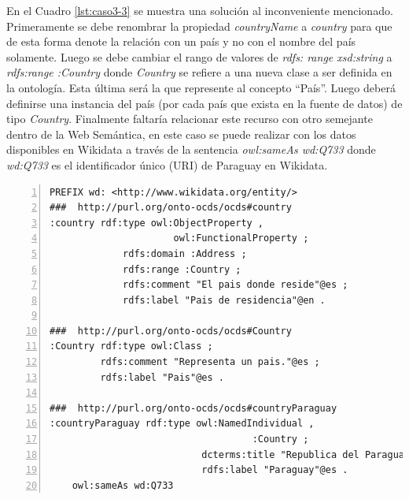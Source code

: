  En el Cuadro \ref{lst:caso3-3} se muestra una solución al inconveniente mencionado. Primeramente se debe renombrar la propiedad \textit{countryName} a \textit{country} para que de esta forma denote la relación con un país y no con el nombre del país solamente. Luego se debe cambiar el rango de valores de \textit{rdfs: range xsd:string}  a \textit{rdfs:range :Country }donde \textit{Country} se refiere a una nueva clase a ser definida en la ontología. Esta última será la que represente al concepto “País”. Luego deberá definirse una instancia del país (por cada país que exista en la fuente de datos) de tipo \textit{Country}. Finalmente faltaría relacionar este recurso con otro semejante dentro de la Web Semántica, en este caso se puede realizar con los datos disponibles en Wikidata a través de la sentencia \textit{owl:sameAs wd:Q733} donde \textit{wd:Q733} es el identificador único (URI) de Paraguay en Wikidata.\hfill \break

\noindent\begin{minipage}[c]{\textwidth}
 \begin{lstlisting}[captionpos=b, caption=Declaración de la Clase Country, label={lst:caso3-3},  numbers=left,  numberstyle=\tiny\color{mygray},frame=single]
PREFIX wd: <http://www.wikidata.org/entity/>
###  http://purl.org/onto-ocds/ocds#country
:country rdf:type owl:ObjectProperty ,
                      owl:FunctionalProperty ;
             rdfs:domain :Address ;
             rdfs:range :Country ;
             rdfs:comment "El pais donde reside"@es ;
             rdfs:label "Pais de residencia"@en .

###  http://purl.org/onto-ocds/ocds#Country
:Country rdf:type owl:Class ;
         rdfs:comment "Representa un pais."@es ;
         rdfs:label "Pais"@es .

###  http://purl.org/onto-ocds/ocds#countryParaguay
:countryParaguay rdf:type owl:NamedIndividual ,
                                    :Country ;
                           dcterms:title "Republica del Paraguay"@es ;
                           rdfs:label "Paraguay"@es .
    owl:sameAs wd:Q733
 \end{lstlisting}
\end{minipage}

